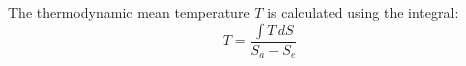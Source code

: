 The thermodynamic mean temperature \( T \) is calculated using the integral:  
\[
T = \frac{\int T \, dS}{S_a - S_e}
\]